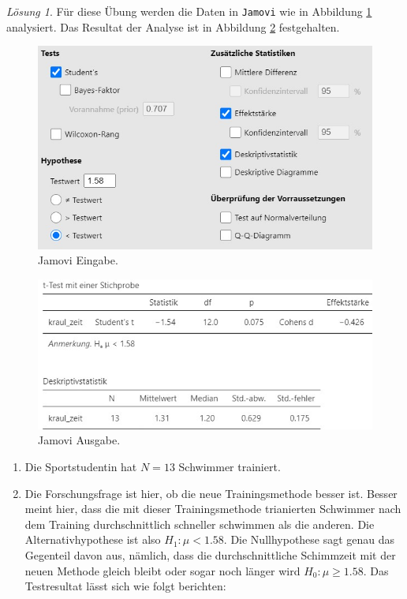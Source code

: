 \documentclass[
]{book}
\providecommand{\tightlist}{%
  \setlength{\itemsep}{0pt}\setlength{\parskip}{0pt}}
\theoremstyle{definition}
\theoremstyle{definition}
\theoremstyle{definition}
\theoremstyle{definition}
\theoremstyle{remark}
\newtheorem*{solution}{Lösung}
\begin{document}
\begin{solution}
Für diese Übung werden die Daten in \texttt{Jamovi} wie in Abbildung \ref{fig:sol-schwimmen-input} analysiert. Das Resultat der Analyse ist in Abbildung \ref{fig:sol-schwimmen-output} festgehalten.

\begin{figure}

{\centering \includegraphics[width=1\linewidth]{figures/05-exr-schwimmen-jmv-input} 

}

\caption{Jamovi Eingabe.}\label{fig:sol-schwimmen-input}
\end{figure}

\begin{figure}

{\centering \includegraphics[width=1\linewidth]{figures/05-exr-schwimmen-jmv-output} 

}

\caption{Jamovi Ausgabe.}\label{fig:sol-schwimmen-output}
\end{figure}

\begin{enumerate}
\def\labelenumi{\alph{enumi})}
\tightlist
\item
  Die Sportstudentin hat \(N = 13\) Schwimmer trainiert.
\item
  Die Forschungsfrage ist hier, ob die neue Trainingsmethode besser ist. Besser meint hier, dass die mit dieser Trainingsmethode trianierten Schwimmer nach dem Training durchschnittlich schneller schwimmen als die anderen. Die Alternativhypothese ist also \(H_1: \mu < 1.58\). Die Nullhypothese sagt genau das Gegenteil davon aus, nämlich, dass die durchschnittliche Schimmzeit mit der neuen Methode gleich bleibt oder sogar noch länger wird \(H_0: \mu \geq 1.58\). Das Testresultat lässt sich wie folgt berichten:
\end{enumerate}


\end{solution}
\end{document}
